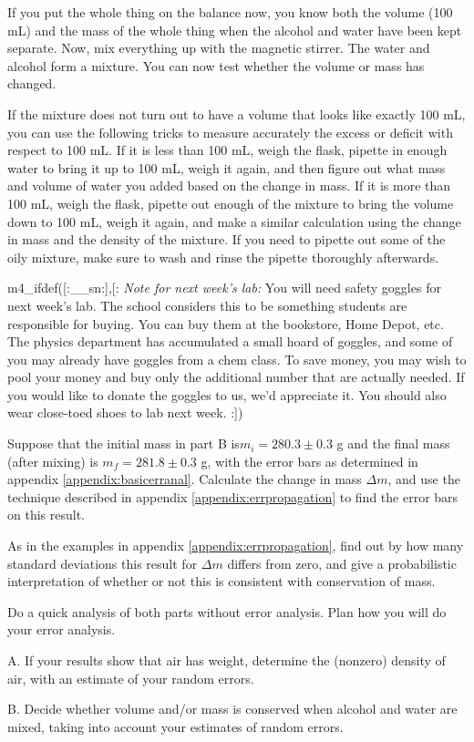If you put the whole thing on the balance now, you know both
the volume (100 mL) and the mass of the whole thing when the
alcohol and water have been kept separate.  Now, mix
everything up with the magnetic stirrer.  The water and
alcohol form a mixture.  You can now test whether the volume
or mass has changed.

If the mixture does not turn out to have a volume that looks
like exactly 100 mL, you can use the following tricks to
measure accurately the excess or deficit with respect to 100
mL.  If it is less than 100 mL, weigh the flask, pipette in
enough water to bring it up to 100 mL, weigh it again, and
then figure out what mass and volume of water you added
based on the change in mass.  If it is more than 100 mL,
weigh the flask, pipette out enough of the mixture to bring
the volume down to 100 mL, weigh it again, and make a
similar calculation using the change in mass and the density
of the mixture.  If you need to pipette out some of the oily
mixture, make sure
to wash and rinse the pipette thoroughly afterwards.

m4_ifdef([:__sn:],[:%
\emph{Note for next week's lab:} You will need safety goggles for next week's lab.
The school considers this to be something students are responsible for buying.
You can buy them at the bookstore, Home Depot, etc. The physics department has accumulated a small
hoard of goggles, and some of you may already have goggles from a chem class. To save money, you may wish to pool your money and buy only the
additional number that are actually needed. If you would like to donate the goggles to us, we'd
appreciate it. You should also wear close-toed shoes to lab next week.
:])

\prelab

\prelabquestion  Suppose that the initial mass in part B is\linebreak[4]
$m_i=280.3\pm0.3$ g and the final mass (after mixing) is $m_f=281.8\pm0.3$ g,
with the error bars as determined in appendix \ref{appendix:basicerranal}.
Calculate the change in mass $\Delta m$, and use the technique described in 
appendix \ref{appendix:errpropagation} to find the error bars on this result.

\prelabquestion As in the examples in appendix \ref{appendix:errpropagation},
find out by how many standard deviations this result for $\Delta m$ differs
from zero, and give a probabilistic interpretation of whether or not this is consistent
with conservation of mass.

\selfcheck

Do a quick analysis of both parts without error analysis.
Plan how you will do your error analysis. 

\analysis

A. If your results show that air has weight, determine the
(nonzero) density of air, with an estimate of your random errors.

B. Decide whether volume and/or mass is conserved when
alcohol and water are mixed, taking into account your
estimates of random errors.
